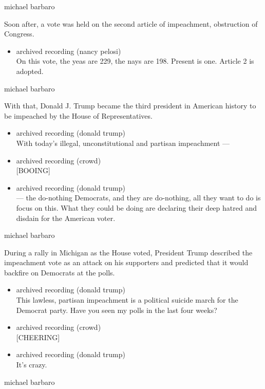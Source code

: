 michael barbaro

Soon after, a vote was held on the second article of impeachment,
obstruction of Congress.

\begin{itemize}
\tightlist
\item
  archived recording (nancy pelosi)\\
  On this vote, the yeas are 229, the nays are 198. Present is one.
  Article 2 is adopted.
\end{itemize}

michael barbaro

With that, Donald J. Trump became the third president in American
history to be impeached by the House of Representatives.

\begin{itemize}
\item
  archived recording (donald trump)\\
  With today's illegal, unconstitutional and partisan impeachment ---
\item
  archived recording (crowd)\\
  {[}BOOING{]}
\item
  archived recording (donald trump)\\
  --- the do-nothing Democrats, and they are do-nothing, all they want
  to do is focus on this. What they could be doing are declaring their
  deep hatred and disdain for the American voter.
\end{itemize}

michael barbaro

During a rally in Michigan as the House voted, President Trump described
the impeachment vote as an attack on his supporters and predicted that
it would backfire on Democrats at the polls.

\begin{itemize}
\item
  archived recording (donald trump)\\
  This lawless, partisan impeachment is a political suicide march for
  the Democrat party. Have you seen my polls in the last four weeks?
\item
  archived recording (crowd)\\
  {[}CHEERING{]}
\item
  archived recording (donald trump)\\
  It's crazy.
\end{itemize}

michael barbaro

